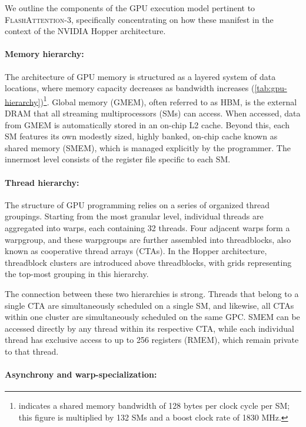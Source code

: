 We outline the components of the GPU execution model pertinent to \textsc{FlashAttention-3}, specifically concentrating on how these manifest in the context of the NVIDIA Hopper architecture.

\paragraph{Memory hierarchy:} The architecture of GPU memory is structured as a layered system of data locations, where memory capacity decreases as bandwidth increases (\cref{tab:gpu-hierarchy})\footnote{\citet{luo2024benchmarking} indicates a shared memory bandwidth of 128 bytes per clock cycle per SM; this figure is multiplied by 132 SMs and a boost clock rate of 1830 MHz.}. Global memory (GMEM), often referred to as HBM, is the external DRAM that all streaming multiprocessors (SMs) can access. When accessed, data from GMEM is automatically stored in an on-chip L2 cache. Beyond this, each SM features its own modestly sized, highly banked, on-chip cache known as shared memory (SMEM), which is managed explicitly by the programmer. The innermost level consists of the register file specific to each SM.

\paragraph{Thread hierarchy:} The structure of GPU programming relies on a series of organized thread groupings. Starting from the most granular level, individual threads are aggregated into warps, each containing 32 threads. Four adjacent warps form a warpgroup, and these warpgroups are further assembled into threadblocks, also known as cooperative thread arrays (CTAs). In the Hopper architecture, threadblock clusters are introduced above threadblocks, with grids representing the top-most grouping in this hierarchy.

The connection between these two hierarchies is strong. Threads that belong to a single CTA are simultaneously scheduled on a single SM, and likewise, all CTAs within one cluster are simultaneously scheduled on the same GPC. SMEM can be accessed directly by any thread within its respective CTA, while each individual thread has exclusive access to up to 256 registers (RMEM), which remain private to that thread.

\paragraph{Asynchrony and warp-specialization:}

